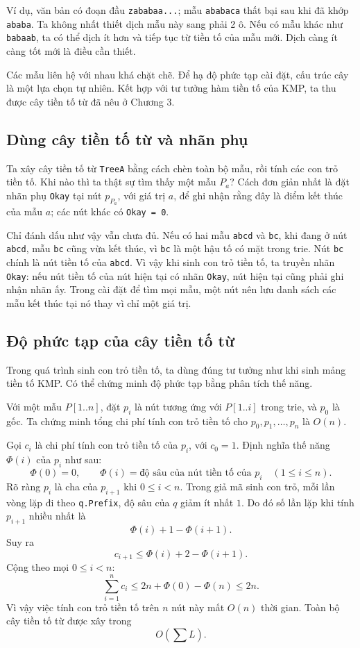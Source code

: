 \documentclass[11pt]{article}
\begin{document}
Ví dụ, văn bản có đoạn đầu \texttt{zababaa...}; mẫu \texttt{ababaca} thất bại
sau khi đã khớp \texttt{ababa}. Ta không nhất thiết dịch mẫu này sang phải
2 ô. Nếu có mẫu khác như \texttt{babaab}, ta có thể dịch ít hơn và tiếp tục từ
tiền tố của mẫu mới. Dịch càng ít càng tốt mới là điều cần thiết.

Các mẫu liên hệ với nhau khá chặt chẽ. Để hạ độ phức tạp cài đặt, cấu trúc
cây là một lựa chọn tự nhiên. Kết hợp với tư tưởng hàm tiền tố của KMP, ta thu
được cây tiền tố từ đã nêu ở Chương 3.

\subsection{Dùng cây tiền tố từ và nhãn phụ}

Ta xây cây tiền tố từ \texttt{TreeA} bằng cách chèn toàn bộ mẫu, rồi tính các
con trỏ tiền tố. Khi nào thì ta thật sự tìm thấy một mẫu $P_a$? Cách đơn giản
nhất là đặt nhãn phụ \texttt{Okay} tại nút $p_{P_a}$, với giá trị $a$, để ghi
nhận rằng đây là điểm kết thúc của mẫu $a$; các nút khác có
\texttt{Okay = 0}.

Chỉ đánh dấu như vậy vẫn chưa đủ. Nếu có hai mẫu \texttt{abcd} và \texttt{bc},
khi đang ở nút \texttt{abcd}, mẫu \texttt{bc} cũng vừa kết thúc, vì
\texttt{bc} là một hậu tố có mặt trong trie. Nút \texttt{bc} chính là nút tiền
tố của \texttt{abcd}. Vì vậy khi sinh con trỏ tiền tố, ta truyền nhãn
\texttt{Okay}: nếu nút tiền tố của nút hiện tại có nhãn \texttt{Okay}, nút
hiện tại cũng phải ghi nhận nhãn ấy. Trong cài đặt để tìm mọi mẫu, một nút nên
lưu danh sách các mẫu kết thúc tại nó thay vì chỉ một giá trị.

\subsection{Độ phức tạp của cây tiền tố từ}

Trong quá trình sinh con trỏ tiền tố, ta dùng đúng tư tưởng như khi sinh mảng
tiền tố KMP. Có thể chứng minh độ phức tạp bằng phân tích thế năng.

Với một mẫu $P[1..n]$, đặt $p_i$ là nút tương ứng với $P[1..i]$ trong trie,
và $p_0$ là gốc. Ta chứng minh tổng chi phí tính con trỏ tiền tố cho
$p_0,p_1,\ldots,p_n$ là $O(n)$.

Gọi $c_i$ là chi phí tính con trỏ tiền tố của $p_i$, với $c_0=1$. Định nghĩa
thế năng $\Phi(i)$ của $p_i$ như sau:
\[
  \Phi(0)=0,\qquad
  \Phi(i)=\text{độ sâu của nút tiền tố của }p_i\quad(1\le i\le n).
\]
Rõ ràng $p_i$ là cha của $p_{i+1}$ khi $0\le i<n$. Trong giả mã sinh con trỏ,
mỗi lần vòng lặp đi theo \texttt{q.Prefix}, độ sâu của $q$ giảm ít nhất $1$.
Do đó số lần lặp khi tính $p_{i+1}$ nhiều nhất là
\[
  \Phi(i)+1-\Phi(i+1).
\]
Suy ra
\[
  c_{i+1}\le \Phi(i)+2-\Phi(i+1).
\]
Cộng theo mọi $0\le i<n$:
\[
  \sum_{i=1}^{n} c_i
  \le 2n+\Phi(0)-\Phi(n)
  \le 2n.
\]
Vì vậy việc tính con trỏ tiền tố trên $n$ nút này mất $O(n)$ thời gian. Toàn
bộ cây tiền tố từ được xây trong
\[
  O\left(\sum L\right).
\]
\end{document}
